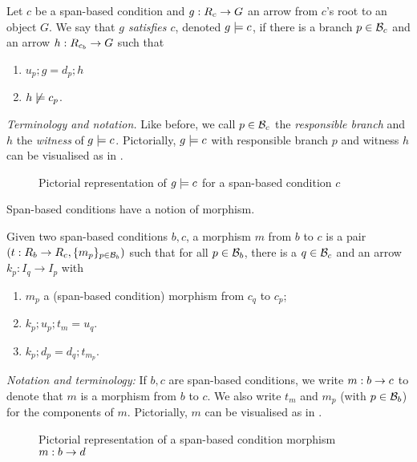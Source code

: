 \begin{definition}
  Let $c$ be a span-based condition and $g:R_c\rightarrow G$ an arrow from $c$'s root to an object $G$. We say that \emph{$g$ satisfies $c$}, denoted $g\models c$, if there is a branch $p\in \mathcal{B}_c$ and an arrow $h:R_{c_b}\rightarrow G$ such that
  \begin{enumerate}
  \item $u_p;g=d_p;h$
  \item $h\not\models c_p$.
  \end{enumerate}
\end{definition}
%
\emph{Terminology and notation.} Like before, we call $p\in\mathcal{B}_c$ the \emph{responsible branch} and $h$ the \emph{witness} of $g\models c$. Pictorially, $g\models c$ with responsible branch $p$ and witness $h$ can be visualised as in .
%
\begin{figure}
  \centering
  
  \caption{Pictorial representation of $g\models c$ for a span-based condition $c$}
\end{figure}

\medskip\noindent
Span-based conditions have a notion of morphism.

\begin{definition}
  Given two span-based conditions $b,c$, a morphism $m$ from $b$ to $c$ is a pair $(t:R_b\rightarrow R_c,\{{m_p}\}_{p\in \mathcal{B}_b})$ such that for all $p\in \mathcal{B}_b$, there is a $q\in \mathcal{B}_c$ and an arrow $k_p:I_q\rightarrow I_p$ with
  \begin{enumerate}
  \item $m_p$ a (span-based condition) morphism from $c_q$ to $c_p$;
  \item $k_p;u_p;t_m=u_q$.
  \item $k_p;d_p=d_q;t_{m_p}$.
  \end{enumerate}
\end{definition}
%
\emph{Notation and terminology:} If $b,c$ are span-based conditions, we write $m:b\rightarrow c$ to denote that $m$ is a morphism from $b$ to $c$. We also write $t_m$ and $m_p$ (with $p\in\mathcal{B}_b$) for the components of $m$. Pictorially, $m$ can be visualised as in .
%
\begin{figure}
  \centering
  
  \caption{Pictorial representation of a span-based condition morphism $m:b\rightarrow d$}
\end{figure}

